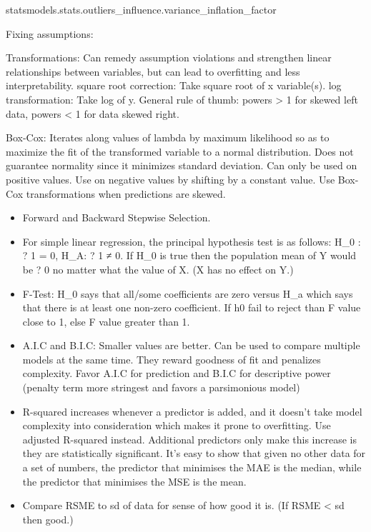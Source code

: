 \documentclass[]{book}
\newenvironment{Shaded}{\begin{snugshade}}{\end{snugshade}}
\newcommand{\NormalTok}[1]{#1}
\begin{document}
\begin{Shaded}
\begin{Highlighting}[]
\NormalTok{statsmodels.stats.outliers_influence.variance_inflation_factor}
\end{Highlighting}
\end{Shaded}

Fixing assumptions:

Transformations: Can remedy assumption violations and strengthen linear relationships between variables, but can lead to overfitting and less interpretability. square root correction: Take square root of x variable(s). log transformation: Take log of y. General rule of thumb: powers \textgreater{} 1 for skewed left data, powers \textless{} 1 for data skewed right.

Box-Cox: Iterates along values of lambda by maximum likelihood so as to maximize the fit of the transformed variable to a normal distribution. Does not guarantee normality since it minimizes standard deviation. Can only be used on positive values. Use on negative values by shifting by a constant value. Use Box-Cox transformations when predictions are skewed.

\begin{itemize}
\item
  Forward and Backward Stepwise Selection.
\item
  For simple linear regression, the principal hypothesis test is as follows: H\_0 : ? 1 = 0, H\_A: ? 1 ≠ 0.
  If H\_0 is true then the population mean of Y would be ? 0 no matter what the value of X. (X has no effect on Y.)
\item
  F-Test: H\_0 says that all/some coefficients are zero versus H\_a which says that there is at least one non-zero coefficient. If h0 fail to reject than F value close to 1, else F value greater than 1.
\item
  A.I.C and B.I.C: Smaller values are better. Can be used to compare multiple models at the same time. They reward goodness of fit and penalizes complexity. Favor A.I.C for prediction and B.I.C for descriptive power (penalty term more stringest and favors a parsimonious model)
\item
  R-squared increases whenever a predictor is added, and it doesn't take model complexity into consideration which makes it prone to overfitting. Use adjusted R-squared instead. Additional predictors only make this increase is they are statistically significant. It's easy to show that given no other data for a set of numbers, the predictor that minimises the MAE is the median, while the predictor that minimises the MSE is the mean.
\item
  Compare RSME to sd of data for sense of how good it is. (If RSME \textless{} sd then good.)
\end{itemize}
\end{document}
